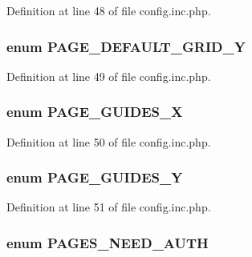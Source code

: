 Definition at line 48 of file config.inc.php.

\hypertarget{config_8inc_8php_ab93c5dcea5ef58747b80594c3d9304d7}{
\subsubsection[{PAGE\_\-DEFAULT\_\-GRID\_\-Y}]{\setlength{\rightskip}{0pt plus 5cm}enum {\bf PAGE\_\-DEFAULT\_\-GRID\_\-Y}}}
\label{config_8inc_8php_ab93c5dcea5ef58747b80594c3d9304d7}


Definition at line 49 of file config.inc.php.

\hypertarget{config_8inc_8php_a81167deb206874270a59273141919fe5}{
\subsubsection[{PAGE\_\-GUIDES\_\-X}]{\setlength{\rightskip}{0pt plus 5cm}enum {\bf PAGE\_\-GUIDES\_\-X}}}
\label{config_8inc_8php_a81167deb206874270a59273141919fe5}


Definition at line 50 of file config.inc.php.

\hypertarget{config_8inc_8php_a3f78eb981e05f649bfff403c0e595d0b}{
\subsubsection[{PAGE\_\-GUIDES\_\-Y}]{\setlength{\rightskip}{0pt plus 5cm}enum {\bf PAGE\_\-GUIDES\_\-Y}}}
\label{config_8inc_8php_a3f78eb981e05f649bfff403c0e595d0b}


Definition at line 51 of file config.inc.php.

\hypertarget{config_8inc_8php_a11f5534165e1764860b16cc7215b2141}{
\subsubsection[{PAGES\_\-NEED\_\-AUTH}]{\setlength{\rightskip}{0pt plus 5cm}enum {\bf PAGES\_\-NEED\_\-AUTH}}}
\label{config_8inc_8php_a11f5534165e1764860b16cc7215b2141}


